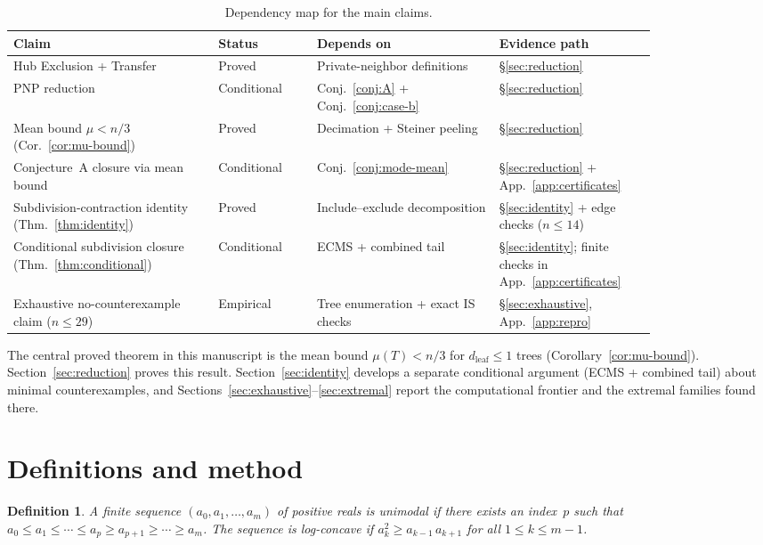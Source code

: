 \documentclass[12pt,oneside]{article}
\newtheorem{definition}[theorem]{Definition}
\theoremstyle{remark}
\newcommand{\dleaf}{d_{\mathrm{leaf}}}    %
\begin{document}
\begin{table}[ht]
  \centering
  \footnotesize
  \caption{Dependency map for the main claims.}
  \label{tab:dependency-map}
  \begin{tabular}{@{}p{0.27\linewidth} p{0.13\linewidth} p{0.24\linewidth} p{0.20\linewidth}@{}}
    \toprule
    Claim & Status & Depends on & Evidence path \\
    \midrule
    Hub Exclusion + Transfer & Proved & Private-neighbor definitions & \S\ref{sec:reduction} \\
    PNP reduction & Conditional & Conj.~\ref{conj:A} + Conj.~\ref{conj:case-b} & \S\ref{sec:reduction} \\
    Mean bound $\mu < n/3$ (Cor.~\ref{cor:mu-bound}) & Proved & Decimation + Steiner peeling & \S\ref{sec:reduction} \\
    Conjecture~A closure via mean bound & Conditional & Conj.~\ref{conj:mode-mean} & \S\ref{sec:reduction} + App.~\ref{app:certificates} \\
    Subdivision-contraction identity (Thm.~\ref{thm:identity}) & Proved & Include--exclude decomposition & \S\ref{sec:identity} + edge checks ($n \le 14$) \\
    Conditional subdivision closure (Thm.~\ref{thm:conditional}) & Conditional & ECMS + combined tail & \S\ref{sec:identity}; finite checks in App.~\ref{app:certificates} \\
    Exhaustive no-counterexample claim ($n \le 29$) & Empirical & Tree enumeration + exact IS checks & \S\ref{sec:exhaustive}, App.~\ref{app:repro} \\
    \bottomrule
  \end{tabular}
\end{table}

The central proved theorem in this manuscript is the mean bound $\mu(T) < n/3$ for $\dleaf \le 1$ trees (Corollary~\ref{cor:mu-bound}).
Section~\ref{sec:reduction} proves this result.
Section~\ref{sec:identity} develops a separate conditional argument (ECMS + combined tail) about minimal counterexamples, and Sections~\ref{sec:exhaustive}--\ref{sec:extremal} report the computational frontier and the extremal families found there.


\section{Definitions and method}\label{sec:method}

\begin{definition}\label{def:unimodal}
  A finite sequence $(a_0, a_1, \dotsc, a_m)$ of positive reals is \emph{unimodal} if there exists an index~$p$ such that $a_0 \le a_1 \le \dotsb \le a_p \ge a_{p+1} \ge \dotsb \ge a_m$.
  The sequence is \emph{log-concave} if $a_k^2 \ge a_{k-1}\, a_{k+1}$ for all $1 \le k \le m-1$.
\end{definition}
\end{document}
